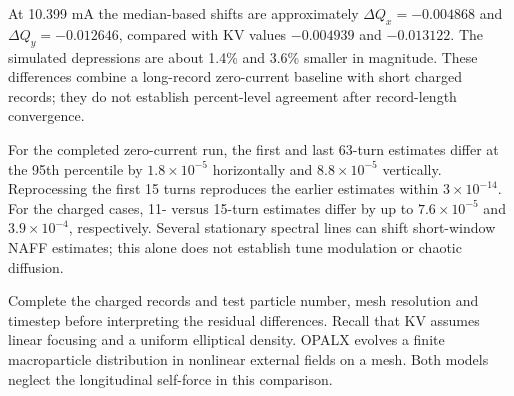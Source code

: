 At 10.399 mA the median-based shifts are approximately
$\Delta Q_x=-0.004868$ and $\Delta Q_y=-0.012646$, compared with KV values
$-0.004939$ and $-0.013122$. The simulated depressions are about
1.4\% and 3.6\% smaller in magnitude. These differences combine a
long-record zero-current baseline with short charged records; they do not
establish percent-level agreement after record-length convergence.

For the completed zero-current run, the first and last 63-turn estimates
differ at the 95th percentile by $1.8\times10^{-5}$ horizontally and
$8.8\times10^{-5}$ vertically. Reprocessing the first 15 turns reproduces the
earlier estimates within $3\times10^{-14}$. For the charged cases, 11- versus
15-turn estimates differ by up to $7.6\times10^{-5}$ and $3.9\times10^{-4}$,
respectively. Several stationary spectral lines can shift short-window NAFF
estimates; this alone does not establish tune modulation or chaotic diffusion.

Complete the charged records and test particle number, mesh resolution and
timestep before interpreting the residual differences. Recall that KV assumes
linear focusing and a uniform elliptical density. OPALX evolves a finite
macroparticle distribution in nonlinear external fields on a mesh. Both models
neglect the longitudinal self-force in this comparison.
